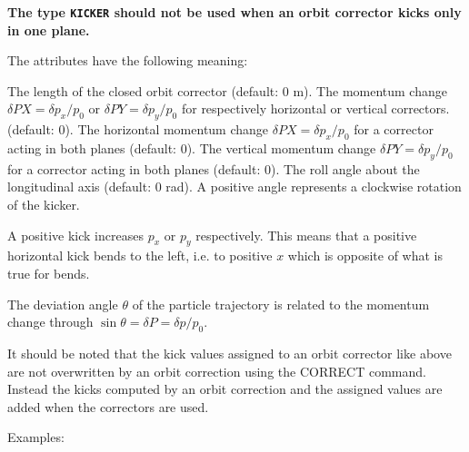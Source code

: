 
{\bf The type {\tt KICKER} should not be used when an orbit corrector
  kicks only in one plane.}

The attributes have the following meaning: 
\begin{madlist}
    The length of the closed orbit corrector (default: 0 m). 
    The momentum change $\delta PX = \delta p_x/p_0$ or 
     $\delta PY = \delta p_y / p_0$ for respectively horizontal or vertical
     correctors. (default: 0).  
    The horizontal momentum change 
     $\delta PX = \delta p_x/p_0$ for a corrector acting in both planes
     (default: 0).  
    The vertical momentum change 
     $\delta PY = \delta p_y/p_0$  for a corrector acting in both planes
     (default: 0).  
    The roll angle about the longitudinal axis (default: 0
     rad). A positive angle represents a clockwise rotation of the
     kicker.  
\end{madlist}

A positive kick increases $p_x$ or $p_y$ respectively. This
means that a positive horizontal kick bends to the left,  i.e. to
positive $x$ which is opposite of what is true for bends.    

The deviation angle $\theta$ of the particle trajectory is related to
the momentum change through  $\sin \theta = \delta P = \delta p / p_0$.

It should be noted that the kick values assigned to an orbit corrector
like above are not overwritten by an orbit correction using the CORRECT
command. Instead the kicks computed by an orbit correction and the
assigned values are added when the correctors are used.  

 Examples: 

